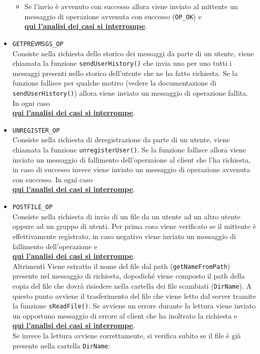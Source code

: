 \documentclass[a4paper,12pt]{report}
\begin{document}
\begin{itemize}
\begin{itemize}
  \item Se l'invio è avvenuto con successo allora viene inviato al mittente un messaggio di operazione avvenuta con successo (\texttt{OP\_OK}) e \\ \textbf{\underline{qui l'analisi dei casi si interrompe}}.
  \end{itemize}
\item \texttt{GETPREVMSGS\_OP}\\
  Consiste nella richiesta dello storico dei messaggi da parte di un utente, viene chiamata la funzione \texttt{sendUserHistory()} che invia uno per uno tutti i messaggi presenti nello storico dell'utente che ne ha fatto richiesta. Se la funzione fallisce per qualche motivo (vedere la documentazione di \texttt{sendUserHistory()}) allora viene inviato un messaggio di operazione fallita. In ogni caso\\ \textbf{\underline{qui l'analisi dei casi si interrompe}}.
\item \texttt{UNREGISTER\_OP}\\
  Consiste nella richiesta di deregistrazione da parte di un utente, viene chiamata la funzione \texttt{unregisterUser()}. Se la funzione fallisce allora viene inviato un messaggio di fallimento dell'operzaione al client che l'ha richiesta, in caso di successo invece viene inviato un messaggio di operazione avvenuta con successo. In ogni caso\\ \textbf{\underline{qui l'analisi dei casi si interrompe}}.
\item \texttt{POSTFILE\_OP}\\
  Consiste nella richiesta di invio di un file da un utente ad un altro utente oppure ad un gruppo di utenti. Per prima cosa viene verificato se il mittente è effettivamente registrato, in caso negativo viene inviato un messaggio di fallimento dell'operazione e\\ \textbf{\underline{qui l'analisi dei casi si interrompe}}.\\ Altrimenti Viene estratto il nome del file dal path (\texttt{getNameFromPath}) presente nel messaggio di richiesta, dopodiché viene composto il path della copia del file che dovrà risiedere nella cartella dei file scambiati (\texttt{DirName}). A questo punto avviene il trasferimento del file che viene letto dal server tramite la funzione \texttt{sReadFile()}. Se avviene un errore durante la lettura viene inviato un opportuno messaggio di errore al client che ha inoltrato la richiesta e\\ \textbf{\underline{qui l'analisi dei casi si interrompe}}.\\ Se invece la lettura avviene correttamente, si verifica subito se il file è già presente nella cartella \texttt{DirName}:

\end{itemize}
\end{document}
